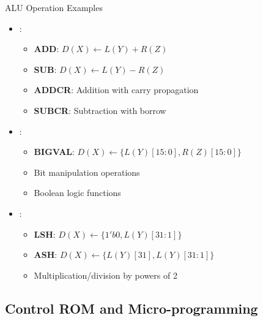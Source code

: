 \begin{frame}{ALU Operation Examples}
\begin{itemize}
\item {}:
\begin{itemize}
\item \textbf{ADD}: $D(X) \leftarrow L(Y) + R(Z)$
\item \textbf{SUB}: $D(X) \leftarrow L(Y) - R(Z)$
\item \textbf{ADDCR}: Addition with carry propagation
\item \textbf{SUBCR}: Subtraction with borrow
\end{itemize}
\vspace{0.5cm}
\item {}:
\begin{itemize}
\item \textbf{BIGVAL}: $D(X) \leftarrow \{L(Y)[15:0], R(Z)[15:0]\}$
\item Bit manipulation operations
\item Boolean logic functions
\end{itemize}
\vspace{0.3cm}
\item {}:
\begin{itemize}
\item \textbf{LSH}: $D(X) \leftarrow \{1'b0, L(Y)[31:1]\}$
\item \textbf{ASH}: $D(X) \leftarrow \{L(Y)[31], L(Y)[31:1]\}$
\item Multiplication/division by powers of 2
\end{itemize}
\end{itemize}
\end{frame}

\subsection{Control ROM and Micro-programming}

